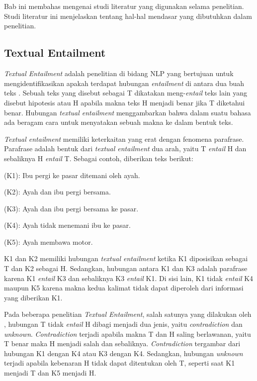 \chapter{\babDua}
Bab ini membahas mengenai studi literatur yang digunakan selama penelitian. Studi literatur ini menjelaskan tentang hal-hal mendasar yang dibutuhkan dalam penelitian.

\section{Textual Entailment}
\textit{Textual Entailment} adalah penelitian di bidang NLP yang bertujuan untuk mengidentifikasikan apakah terdapat hubungan \textit{entailment} di antara dua buah teks \citep{dagan2005}. Sebuah teks yang disebut sebagai T dikatakan meng-\textit{entail} teks lain yang disebut hipotesis atau H apabila makna teks H menjadi benar jika T diketahui benar. Hubungan \textit{textual entailment} menggambarkan bahwa dalam suatu bahasa ada beragam cara untuk menyatakan sebuah makna ke dalam bentuk teks.

\textit{Textual entailment} memiliki keterkaitan yang erat dengan fenomena parafrase. Parafrase adalah bentuk dari \textit{textual entailment} dua arah, yaitu T \textit{entail} H dan sebaliknya H \textit{entail} T. Sebagai contoh, diberikan teks berikut:

(K1): Ibu pergi ke pasar ditemani oleh ayah.

(K2): Ayah dan ibu pergi bersama.

(K3): Ayah dan ibu pergi bersama ke pasar.

(K4): Ayah tidak menemani ibu ke pasar.

(K5): Ayah membawa motor.

\noindent K1 dan K2 memiliki hubungan \textit{textual entailment} ketika K1 diposisikan sebagai T dan K2 sebagai H. Sedangkan, hubungan antara K1 dan K3 adalah parafrase karena K1 \textit{entail} K3 dan sebaliknya K3 \textit{entail} K1. Di sisi lain, K1 tidak \textit{entail} K4 maupun K5 karena makna kedua kalimat tidak dapat diperoleh dari informasi yang diberikan K1.

Pada beberapa penelitian \textit{Textual Entailment}, salah satunya yang dilakukan oleh \cite{giampiccolo2008fourth}, hubungan T tidak \textit{entail} H dibagi menjadi dua jenis, yaitu \textit{contradiction} dan \textit{unknown}. \textit{Contradiction} terjadi apabila makna T dan H saling berlawanan, yaitu T benar maka H menjadi salah dan sebaliknya. \textit{Contradiction} tergambar dari hubungan K1 dengan K4 atau K3 dengan K4. Sedangkan, hubungan \textit{unknown} terjadi apabila kebenaran H tidak dapat ditentukan oleh T, seperti saat K1 menjadi T dan K5 menjadi H.

